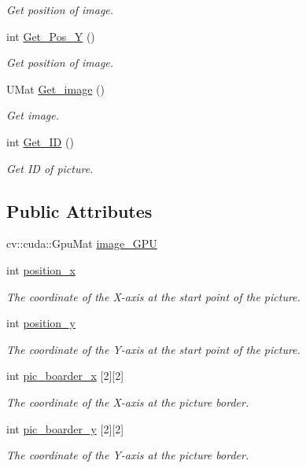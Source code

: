 \begin{DoxyCompactItemize}
\begin{DoxyCompactList}\small\item\em Get position of image. \end{DoxyCompactList}\item 
int \hyperlink{class_my_picture_1_1_picture_a38ad2e88393e8b953d7b82946eb1aacb}{Get\+\_\+\+Pos\+\_\+Y} ()
\begin{DoxyCompactList}\small\item\em Get position of image. \end{DoxyCompactList}\item 
U\+Mat \hyperlink{class_my_picture_1_1_picture_a16e67fa736ac4f7db5a07d728c1f24e5}{Get\+\_\+image} ()
\begin{DoxyCompactList}\small\item\em Get image. \end{DoxyCompactList}\item 
int \hyperlink{class_my_picture_1_1_picture_a49cc1e556f631e0ef94f9451ae8fb52f}{Get\+\_\+\+ID} ()
\begin{DoxyCompactList}\small\item\em Get ID of picture. \end{DoxyCompactList}\end{DoxyCompactItemize}
\subsection*{Public Attributes}
\begin{DoxyCompactItemize}
\item 
cv\+::cuda\+::\+Gpu\+Mat \hyperlink{class_my_picture_1_1_picture_a3493baf3ad2f8bf43b13d22cbce3f0c8}{image\+\_\+\+G\+PU}
\item 
int \hyperlink{group___the_ga5f9040e5635fe0db42cfcf7f2f2219a6}{position\+\_\+x}
\begin{DoxyCompactList}\small\item\em The coordinate of the X-\/axis at the start point of the picture. \end{DoxyCompactList}\item 
int \hyperlink{group___the_ga86b8259886daf41584d67aca98ef9b95}{position\+\_\+y}
\begin{DoxyCompactList}\small\item\em The coordinate of the Y-\/axis at the start point of the picture. \end{DoxyCompactList}\item 
int \hyperlink{group__picture_gac92ca913b51e02990c1b75ac085d3593}{pic\+\_\+boarder\+\_\+x} \mbox{[}2\mbox{]}\mbox{[}2\mbox{]}
\begin{DoxyCompactList}\small\item\em The coordinate of the X-\/axis at the picture border. \end{DoxyCompactList}\item 
int \hyperlink{group__picture_ga062abb41cc6618e8def5f5c4a60603f3}{pic\+\_\+boarder\+\_\+y} \mbox{[}2\mbox{]}\mbox{[}2\mbox{]}
\begin{DoxyCompactList}\small\item\em The coordinate of the Y-\/axis at the picture border. \end{DoxyCompactList}\end{DoxyCompactItemize}
